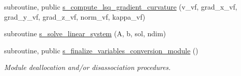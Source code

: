 \begin{DoxyCompactItemize}
subroutine, public \hyperlink{namespacem__variables__conversion_a953abb55b23caddc730076fa837a8063}{s\+\_\+compute\+\_\+lsq\+\_\+gradient\+\_\+curvature} (v\+\_\+vf, grad\+\_\+x\+\_\+vf, grad\+\_\+y\+\_\+vf, grad\+\_\+z\+\_\+vf, norm\+\_\+vf, kappa\+\_\+vf)
\item 
subroutine \hyperlink{namespacem__variables__conversion_afd3e70122b6f083342f644fdf5b18694}{s\+\_\+solve\+\_\+linear\+\_\+system} (A, b, sol, ndim)
\item 
subroutine, public \hyperlink{namespacem__variables__conversion_a6a3f90e69ef4dea304495d0f7c068de2}{s\+\_\+finalize\+\_\+variables\+\_\+conversion\+\_\+module} ()
\begin{DoxyCompactList}\small\item\em Module deallocation and/or disassociation procedures. \end{DoxyCompactList}\end{DoxyCompactItemize}
